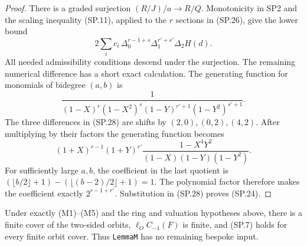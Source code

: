 \begin{proof}
There is a graded surjection $(R/J)/a\to R/Q$.  Monotonicity in
SP2 and the scaling inequality (SP.11), applied to the $r$ sections
in (SP.26), give the lower bound
\[
 2\sum_i c_i\,
       \Delta_0^{r-1+s}\Delta_1^{r'+s'}\Delta_2H(d).
 \tag{SP.28}
\]
All needed admissibility conditions descend under the surjection.
The remaining numerical difference has a short exact calculation.
The generating function for monomials of bidegree $(a,b)$ is
\[
 \frac{1}{(1-X)^r(1-X^2)^s(1-Y)^{r'+1}(1-Y^2)^{s'+1}}.
\]
The three differences in (SP.28) are shifts by $(2,0),(0,2),(4,2)$.
After multiplying by their factors the generating function becomes
\[
 (1+X)^{r-1}(1+Y)^{r'}
               \frac{1-X^4Y^2}{(1-X)(1-Y)(1-Y^2)}.
 \tag{SP.29}
\]
For sufficiently large $a,b$, the coefficient in the last quotient
is
$(\lfloor b/2\rfloor+1)-(\lfloor(b-2)/2\rfloor+1)=1$.
The polynomial factor therefore makes the coefficient exactly
$2^{r-1+r'}$.  Substitution in (SP.28) proves (SP.24).
\end{proof}

\begin{theorem}
\label{claim:SP6}
Under exactly (M1)--(M5) and the ring and valuation hypotheses
above, there is a finite cover of the two-sided orbits,
$\ell_OC_{-1}(F)$ is finite, and (SP.7) holds for every finite orbit
cover.  Thus \texttt{LemmaM} has no remaining bespoke input.
\end{theorem}

